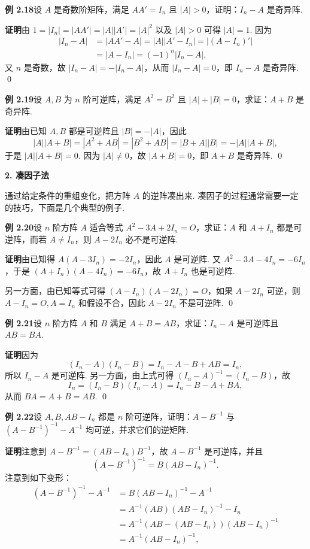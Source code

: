 \documentclass[UTF8, 12pt, fontset=fandol, oneside]{ctexart}
\begin{document}
\noindent\textbf{例 2.18}\quad 设 $A$ 是奇数阶矩阵，满足 $AA'=I_n$ 且 $|A|>0$，证明：$I_n-A$ 是奇异阵.

\noindent\textbf{证明}\quad 由 $1=|I_n|=|AA'|=|A||A'|=|A|^2$ 以及 $|A|>0$ 可得 $|A|=1$. 因为
\[
\begin{aligned}
|I_n-A|
&=|AA'-A|=|A||A'-I_n|=|(A-I_n)'|\\
&=|A-I_n|=(-1)^n|I_n-A|,
\end{aligned}
\]
又 $n$ 是奇数，故 $|I_n-A|=-|I_n-A|$，从而 $|I_n-A|=0$，即 $I_n-A$ 是奇异阵. \qed

\noindent\textbf{例 2.19}\quad 设 $A,B$ 为 $n$ 阶可逆阵，满足 $A^2=B^2$ 且 $|A|+|B|=0$，求证：$A+B$ 是奇异阵.

\noindent\textbf{证明}\quad 由已知 $A,B$ 都是可逆阵且 $|B|=-|A|$，因此
\[
|A||A+B|=|A^2+AB|=|B^2+AB|=|B+A||B|=-|A||A+B|,
\]
于是 $|A||A+B|=0$. 因为 $|A|\ne0$，故 $|A+B|=0$，即 $A+B$ 是奇异阵. \qed

\noindent\textbf{2. 凑因子法}

通过给定条件的重组变化，把方阵 $A$ 的逆阵凑出来. 凑因子的过程通常需要一定的技巧，下面是几个典型的例子.

\noindent\textbf{例 2.20}\quad 设 $n$ 阶方阵 $A$ 适合等式 $A^2-3A+2I_n=O$，求证：$A$ 和 $A+I_n$ 都是可逆阵，而若 $A\ne I_n$，则 $A-2I_n$ 必不是可逆阵.

\noindent\textbf{证明}\quad 由已知得 $A(A-3I_n)=-2I_n$，因此 $A$ 是可逆阵. 又 $A^2-3A-4I_n=-6I_n$，于是 $(A+I_n)(A-4I_n)=-6I_n$，故 $A+I_n$ 也是可逆阵.

另一方面，由已知等式可得 $(A-I_n)(A-2I_n)=O$，如果 $A-2I_n$ 可逆，则 $A-I_n=O,A=I_n$ 和假设不合，因此 $A-2I_n$ 不是可逆阵. \qed

\noindent\textbf{例 2.21}\quad 设 $n$ 阶方阵 $A$ 和 $B$ 满足 $A+B=AB$，求证：$I_n-A$ 是可逆阵且 $AB=BA$.

\noindent\textbf{证明}\quad 因为
\[
(I_n-A)(I_n-B)=I_n-A-B+AB=I_n,
\]
所以 $I_n-A$ 是可逆阵. 另一方面，由上式可得 $(I_n-A)^{-1}=(I_n-B)$，故
\[
I_n=(I_n-B)(I_n-A)=I_n-B-A+BA,
\]
从而 $BA=A+B=AB$. \qed

\noindent\textbf{例 2.22}\quad 设 $A,B,AB-I_n$ 都是 $n$ 阶可逆阵，证明：$A-B^{-1}$ 与 $(A-B^{-1})^{-1}-A^{-1}$ 均可逆，并求它们的逆矩阵.

\noindent\textbf{证明}\quad 注意到 $A-B^{-1}=(AB-I_n)B^{-1}$，故 $A-B^{-1}$ 是可逆阵，并且
\[
(A-B^{-1})^{-1}=B(AB-I_n)^{-1}.
\]
注意到如下变形：
\[
\begin{aligned}
(A-B^{-1})^{-1}-A^{-1}
&=B(AB-I_n)^{-1}-A^{-1}\\
&=A^{-1}(AB)(AB-I_n)^{-1}-I_n\\
&=A^{-1}(AB-(AB-I_n))(AB-I_n)^{-1}\\
&=A^{-1}(AB-I_n)^{-1},
\end{aligned}
\]
\end{document}
